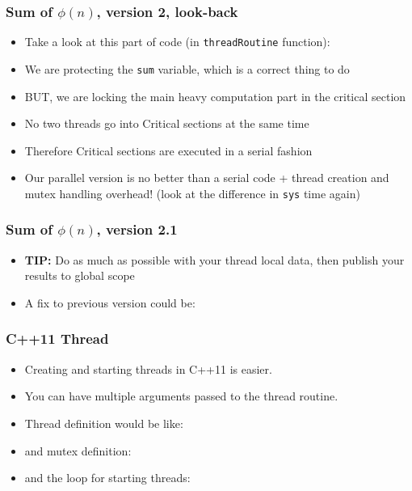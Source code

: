 \documentclass[aspectratio=43,11pt]{beamer}
\begin{document}
\begin{frame}
  \frametitle{Sum of $\phi(n)$, version 2, look-back}

  \begin{itemize}
    \item Take a look at this part of code (in {\tt threadRoutine} function):
    
    
    \item We are protecting the {\tt sum} variable, which is a correct thing to do
    \item BUT, we are locking the main heavy computation part in the critical section
    \item No two threads go into Critical sections at the same time
    \item Therefore Critical sections are executed in a serial fashion
    \item Our parallel version is no better than a serial code + thread creation and mutex handling overhead!
    (look at the difference in {\tt sys} time again)
  \end{itemize}
\end{frame}
\begin{frame}
  \frametitle{Sum of $\phi(n)$, version 2.1}
  
  \begin{itemize}
    \item \textbf{TIP:} Do as much as possible with your thread local data, then publish your results
    to global scope
    \item A fix to previous version could be:
    
  \end{itemize}
  \let\thefootnote\relax{}
\end{frame}
\begin{frame}
  \frametitle{C++11 Thread}

  \begin{itemize}
    \item Creating and starting threads in C++11 is easier.
    \item You can have multiple arguments passed to the thread routine.
    \item Thread definition would be like:
    
    \item and mutex definition:
    
    \item and the loop for starting threads:
    
  \end{itemize}
\end{frame}
\end{document}
